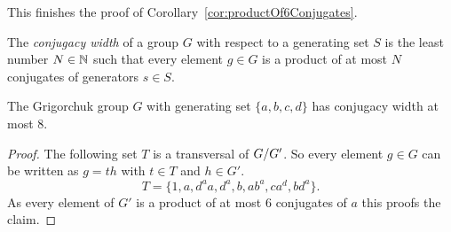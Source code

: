 \documentclass[a4paper,11pt]{amsart}
\begin{document}
This finishes the proof of Corollary~\ref{cor:productOf6Conjugates}.
\begin{defi}
 The \emph{conjugacy width} of a group $G$ with respect to a generating set $S$ 
 is the least number $N\in\mathbb{N}$ such that every element $g\in G$ is a product of
 at most $N$ conjugates of generators $s\in S$.
\end{defi}
\begin{cor}
 The Grigorchuk group $G$ with generating set $\{a,b,c,d\}$ has conjugacy width at most $8$.
\end{cor}
\begin{proof}
 The following set $T$ is a transversal of ${G/G'}$. So every element $g\in G$ can be written as $g=th$ with $t\in T$ and $h\in G'$.
 \[T=\{1,a,d^aa,d^a,b,ab^a,ca^d,bd^a\}.\]
 As every element of $G'$ is a product of at most $6$ conjugates of $a$ this proofs the claim.

\end{proof}

\end{document}
